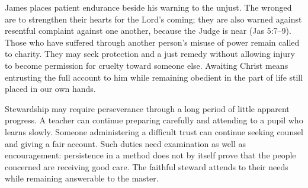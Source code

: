 James places patient endurance beside his warning to the unjust. The wronged are to strengthen their hearts for the Lord's coming; they are also warned against resentful complaint against one another, because the Judge is near (Jas 5:7--9). Those who have suffered through another person's misuse of power remain called to charity. They may seek protection and a just remedy without allowing injury to become permission for cruelty toward someone else. Awaiting Christ means entrusting the full account to him while remaining obedient in the part of life still placed in our own hands.

Stewardship may require perseverance through a long period of little apparent progress. A teacher can continue preparing carefully and attending to a pupil who learns slowly. Someone administering a difficult trust can continue seeking counsel and giving a fair account. Such duties need examination as well as encouragement: persistence in a method does not by itself prove that the people concerned are receiving good care. The faithful steward attends to their needs while remaining answerable to the master.

